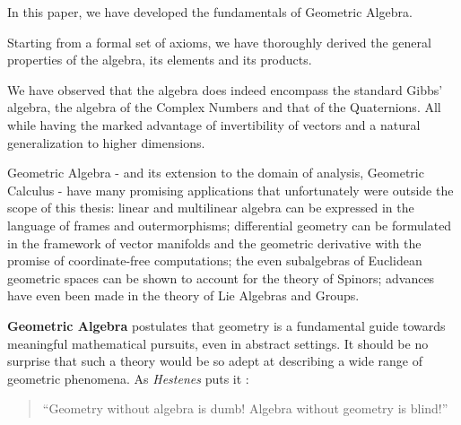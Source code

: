 In this paper, we have developed the fundamentals of Geometric Algebra.

Starting from a formal set of axioms, we have thoroughly derived the general properties of the algebra, its elements and its products.

We have observed that the algebra does indeed encompass the standard Gibbs' algebra, the algebra of the Complex Numbers and that of the Quaternions. All while having the marked advantage of invertibility of vectors and a natural generalization to higher dimensions.

Geometric Algebra - and its extension to the domain of analysis, Geometric Calculus - have many promising applications that unfortunately were outside the scope of this thesis: linear and multilinear algebra can be expressed in the language of frames and outermorphisms; differential geometry can be formulated in the framework of vector manifolds and the geometric derivative with the promise of coordinate-free computations; the even subalgebras of Euclidean geometric spaces can be shown to account for the theory of Spinors; advances have even been made in the theory of Lie Algebras and Groups.

\textbf{Geometric Algebra} postulates that geometry is a fundamental guide towards meaningful mathematical pursuits, even in abstract settings. It should be no surprise that such a theory would be so adept at describing a wide range of geometric phenomena. As \textit{Hestenes} puts it \cite[p. xii]{ga-origin}:
\begin{quote}
	``Geometry without algebra is dumb! Algebra without geometry is blind!''
\end{quote}


